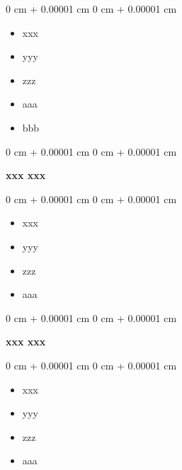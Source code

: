 \documentclass[10pt, letterpaper]{article}
\newenvironment{highlights}{
    \begin{itemize}[
        topsep=0.10 cm,
        parsep=0.10 cm,
        partopsep=0pt,
        itemsep=0pt,
        leftmargin=0 cm + 10pt
    ]
}{
    \end{itemize}
} %
\newenvironment{onecolentry}{
    \begin{adjustwidth}{
        0 cm + 0.00001 cm
    }{
        0 cm + 0.00001 cm
    }
}{
    \end{adjustwidth}
} %
\begin{document}
        \vspace{0.10 cm}
        \begin{onecolentry}
            \begin{highlights}
                \item xxx 
                \item yyy
                \item zzz
                \item aaa
                \item bbb
            \end{highlights}
        \end{onecolentry}

        \vspace{0.2 cm}

        \begin{onecolentry}{
            
        }
            \textbf{xxx xxx}\end{onecolentry}

        \vspace{0.10 cm}
        \begin{onecolentry}
            \begin{highlights}
                \item xxx
                \item yyy
                \item zzz
                \item aaa
                
            \end{highlights}
        \end{onecolentry}

        \vspace{0.2 cm}

        \begin{onecolentry}{
            
        }
            \textbf{xxx xxx}\end{onecolentry}

        
        \begin{onecolentry}
            \begin{highlights}
                \item xxx
                \item yyy
                \item zzz
                \item aaa
            \end{highlights}
        \end{onecolentry}
\end{document}
